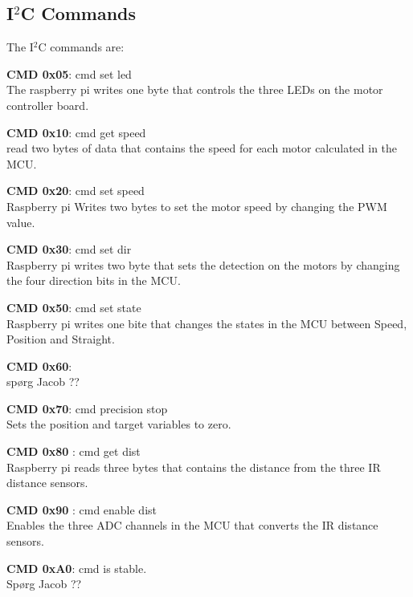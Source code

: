 \subsection{I$^2$C Commands}
The I$^2$C commands are:

\begin{itemize}
	\begin{item}
		\textbf{ CMD 0x05}: cmd set led\\ The raspberry pi writes one byte that controls the three LEDs on the motor controller board.
	\end{item}

	\begin{item}
		\textbf{ CMD 0x10}: cmd get speed\\ read two bytes of data that contains the speed for each motor calculated in the MCU.
	\end{item}
	
	\begin{item}
		\textbf{ CMD 0x20}: cmd set speed \\ Raspberry pi Writes two bytes to set the motor speed by changing the PWM value.
	\end{item}	
	
	\begin{item}
		\textbf{ CMD 0x30}: cmd set dir\\ Raspberry pi writes two byte that sets the detection on the motors by changing the four direction bits in the MCU.
	\end{item}

	\begin{item}
		\textbf{CMD 0x50}: cmd set state\\ Raspberry pi writes one bite that changes the states in the MCU between Speed, Position and Straight. 
	\end{item}
	
	\begin{item}
		\textbf{ CMD 0x60}: \\ spørg Jacob ??
	\end{item}
	
	\begin{item}
		\textbf{CMD 0x70}:  cmd precision stop\\ Sets the position and target variables to zero.
	\end{item}

	\begin{item}
		\textbf{CMD 0x80 }: cmd get dist\\ Raspberry pi reads three bytes that contains the distance from the three IR distance sensors.
	\end{item}
	
	\begin{item}
		\textbf{CMD 0x90 }: cmd enable dist\\ Enables the three ADC channels in the MCU that converts the IR distance sensors.
	\end{item}			

	\begin{item}
		\textbf{ CMD 0xA0}: cmd is stable. \\ Spørg Jacob ??
	\end{item}		

\end{itemize}